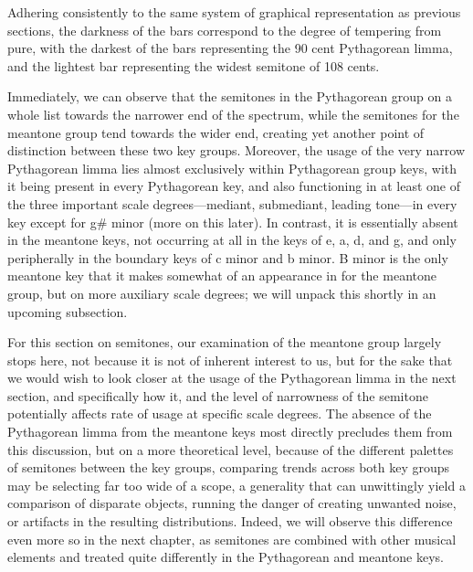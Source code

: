     \begin{center}
    \end{center}
    


    \begin{center}
    \end{center}
    
    Adhering consistently to the same system of graphical representation as
previous sections, the darkness of the bars correspond to the degree of
tempering from pure, with the darkest of the bars representing the 90
cent Pythagorean limma, and the lightest bar representing the widest
semitone of 108 cents.

Immediately, we can observe that the semitones in the Pythagorean group
on a whole list towards the narrower end of the spectrum, while the
semitones for the meantone group tend towards the wider end, creating
yet another point of distinction between these two key groups. Moreover,
the usage of the very narrow Pythagorean limma lies almost exclusively
within Pythagorean group keys, with it being present in every
Pythagorean key, and also functioning in at least one of the three
important scale degrees---mediant, submediant, leading tone---in
every key except for g\# minor (more on this later). In contrast, it is
essentially absent in the meantone keys, not occurring at all in the
keys of e, a, d, and g, and only peripherally in the boundary keys of c
minor and b minor. B minor is the only meantone key that it makes
somewhat of an appearance in for the meantone group, but on more
auxiliary scale degrees; we will unpack this shortly in an upcoming
subsection.

For this section on semitones, our examination of the meantone group
largely stops here, not because it is not of inherent interest to us,
but for the sake that we would wish to look closer at the usage of the
Pythagorean limma in the next section, and specifically how it, and the
level of narrowness of the semitone potentially affects rate of usage at
specific scale degrees. The absence of the Pythagorean limma from the
meantone keys most directly precludes them from this discussion, but on
a more theoretical level, because of the different palettes of semitones
between the key groups, comparing trends across both key groups may be
selecting far too wide of a scope, a generality that can unwittingly
yield a comparison of disparate objects, running the danger of creating
unwanted noise, or artifacts in the resulting distributions. Indeed, we
will observe this difference even more so in the next chapter, as
semitones are combined with other musical elements and treated quite
differently in the Pythagorean and meantone keys.


